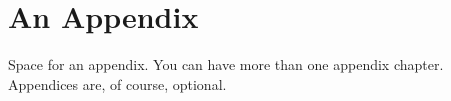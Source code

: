 \cleardoubleoddpage%
\chapter{An Appendix}

Space for an appendix.
You can have more than one appendix chapter.
Appendices are, of course, optional.



